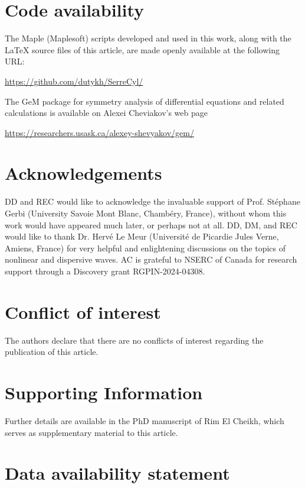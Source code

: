 \documentclass[alpha-refs, 12pt]{wiley-article}
\begin{document}
\vspace*{1.5em}

\section*{Code availability}

The Maple (Maplesoft\texttrademark) scripts developed and used in this work, along with the LaTeX source files of this article, are made openly available at the following URL:

\url{https://github.com/dutykh/SerreCyl/}

The GeM package for symmetry analysis of differential equations and related calculations is available on Alexei Cheviakov's web page

\url{https://researchers.usask.ca/alexey-shevyakov/gem/}

\section*{Acknowledgements}

DD and REC would like to acknowledge the invaluable support of Prof. St\'ephane Gerbi (University Savoie Mont Blanc, Chamb\'ery, France), without whom this work would have appeared much later, or perhaps not at all. DD, DM, and REC would like to thank Dr. Herv\'e Le Meur (Universit\'e de Picardie Jules Verne, Amiens, France) for very helpful and enlightening discussions on the topics of nonlinear and dispersive waves. AC is grateful to NSERC of Canada for research support through a Discovery grant RGPIN-2024-04308.

\section*{Conflict of interest}

The authors declare that there are no conflicts of interest regarding the publication of this article.

\section*{Supporting Information}

Further details are available in the PhD manuscript of Rim El Cheikh, which serves as supplementary material to this article.

\section*{Data availability statement}
\end{document}
